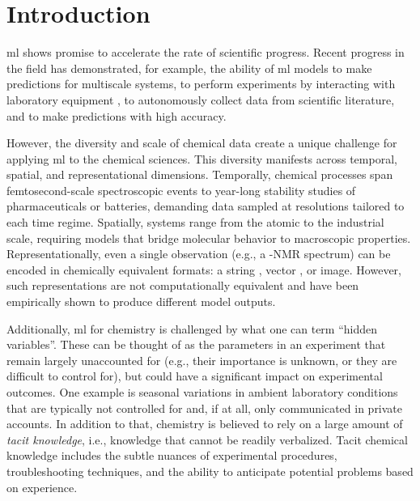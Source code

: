 \section{Introduction}

\Gls{ml} shows promise to accelerate the rate of scientific progress.\autocite{jablonka2020big,Butler_2018,yano2022case,Yao_2022,De_Luna_2017,wang2023scientific} 
Recent progress in the field has demonstrated, for example, the ability of \gls{ml} models to make predictions for multiscale systems,\autocite{charalambous2024holistic,yang2020machine, Deringer_2021} to perform experiments by interacting with laboratory equipment \autocite{boiko2023autonomous,coley2019robotic}, to autonomously collect data from scientific literature,\autocite{schilling2025text,zhang2024fine,dagdelen2024structured} and to make predictions with high accuracy.\autocite{jablonka2024leveraging,jablonka2023machine,jung2024automatic, Rupp_2012,Keith_2021,Wu_2024} 

However, the diversity and scale of chemical data create a unique challenge for applying \gls{ml} to the chemical sciences. 
This diversity manifests across temporal, spatial, and representational dimensions. Temporally, chemical processes span femtosecond-scale spectroscopic events to year-long stability studies of pharmaceuticals or batteries, demanding data sampled at resolutions tailored to each time regime. 
Spatially, systems range from the atomic to the industrial scale, requiring models that bridge molecular behavior to macroscopic properties. 
Representationally, even a single observation (e.g., a -NMR spectrum) can be encoded in chemically equivalent formats: a string \autocite{alberts2024unraveling}, vector \autocite{mirza2024elucidating}, or image\autocite{alberts2024unraveling}. 
However, such representations are not computationally equivalent and have been empirically shown to produce different model outputs.\autocite{atz2024prospective,alampara2024probing,wu2024t,skinnider2024invalid}

Additionally, \gls{ml} for chemistry is challenged by what one can term \enquote{hidden variables}. 
These can be thought of as the parameters in an experiment that remain largely unaccounted for (e.g., their importance is unknown, or they are difficult to control for), but could have a significant impact on experimental outcomes. 
One example is seasonal variations in ambient laboratory conditions that are typically not controlled for and, if at all, only communicated in private accounts.\autocite{Nega_2021}
In addition to that, chemistry is believed to rely on a large amount of \emph{tacit knowledge}, i.e., knowledge that cannot be readily verbalized.\autocite{Taber_2014, Polanyi_2009}  
Tacit chemical knowledge includes the subtle nuances of experimental procedures, troubleshooting techniques, and the ability to anticipate potential problems based on experience.

